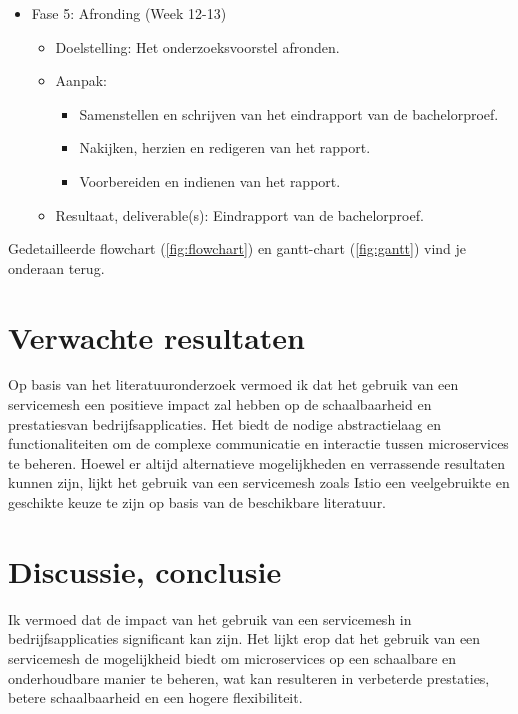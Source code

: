 \documentclass{hogent-article}
\begin{document}
\begin{itemize}
\begin{itemize}
    \end{itemize}   
    \item Fase 5: Afronding (Week 12-13)
    \begin{itemize} 
        \item Doelstelling: Het onderzoeksvoorstel afronden.
        \item Aanpak:
        \begin{itemize} 
            \item Samenstellen en schrijven van het eindrapport van de bachelorproef.
            \item Nakijken, herzien en redigeren van het rapport.
            \item Voorbereiden en indienen van het rapport.
        \end{itemize}     
        \item Resultaat, deliverable(s): Eindrapport van de bachelorproef.  
    \end{itemize}
\end{itemize}

Gedetailleerde flowchart (\ref{fig:flowchart}) en gantt-chart (\ref{fig:gantt}) vind je onderaan terug.


\section{Verwachte resultaten}%
\label{sec:verwachte-resultaten}

Op basis van het literatuuronderzoek vermoed ik dat het gebruik van een servicemesh een positieve impact zal hebben op de schaalbaarheid en prestatiesvan bedrijfsapplicaties. Het biedt de nodige abstractielaag en functionaliteiten om de complexe communicatie en interactie tussen microservices te beheren. Hoewel er altijd alternatieve mogelijkheden en verrassende resultaten kunnen zijn, lijkt het gebruik van een servicemesh zoals Istio een veelgebruikte en geschikte keuze te zijn op basis van de beschikbare literatuur.


\section{Discussie, conclusie}%
\label{sec:discussie-conclusie}
Ik vermoed dat de impact van het gebruik van een servicemesh in bedrijfsapplicaties significant kan zijn. Het lijkt erop dat het gebruik van een servicemesh de mogelijkheid biedt om microservices op een schaalbare en onderhoudbare manier te beheren, wat kan resulteren in verbeterde prestaties, betere schaalbaarheid en een hogere flexibiliteit.
\end{document}
